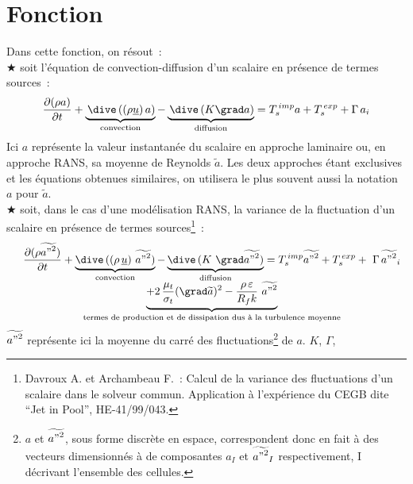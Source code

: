 \section*{Fonction}
Dans cette fonction, on résout~: \\
{\tiny$\bigstar$} soit l'équation de convection-diffusion d'un scalaire en
présence de termes sources~:
\begin{equation}
\frac {\partial  (\rho a)}{\partial t} +
\underbrace{\,\dive\,((\rho \underline{u})\,a)}_{\text{convection}}
- \underbrace{\,\dive\,(K \grad a)}_{\text{diffusion}} = T_s^{\,imp} a
+T_s^{\,exp} +\Gamma\,a_i
\end{equation}
Ici $a$ représente la valeur instantanée du scalaire en approche laminaire ou,
en approche RANS, sa moyenne de Reynolds $\widetilde{a}$. Les deux approches
étant exclusives et les équations obtenues similaires, on utilisera le plus
souvent aussi la notation $a$ pour $\widetilde{a}$.\\
{\tiny$\bigstar$} soit, dans le cas d'une modélisation RANS, la variance de la
fluctuation d'un scalaire en présence de termes sources\footnote{Davroux A. et
Archambeau F.~: Calcul de la variance des fluctuations
d'un scalaire dans le solveur commun. Application à l'expérience du CEGB dite
``Jet in Pool'', HE-41/99/043.}~:
\begin{equation}
\begin{array}{lcl}
&\displaystyle
 \frac {\partial  (\rho \widetilde{{a"}^2})}{\partial t} +
\underbrace{\dive\,((\rho\,\underline{u})\ \widetilde{{a"}^2})}_{\text{convection}}
- \underbrace{\dive\,(K\ \grad \widetilde{{a"}^2})}_{\text{diffusion}} = T_s^{\,imp} \widetilde{{a"}^2}
+T_s^{\,exp} +\ \Gamma\,\widetilde{{a"}^2}_i \\
&\displaystyle \underbrace {+ 2\,\frac{\mu_t}{\sigma_t}(\grad \widetilde{a})^2 -
\frac{\rho\,\varepsilon}{R_f k}\ \widetilde{{a"}^2}}_{\text{termes de production et
de dissipation dus à la turbulence moyenne}}
\end{array}
\end{equation}
$\widetilde{{a"}^2}$ représente ici la moyenne du carré des fluctuations\footnote{$a$ et
$\widetilde{{a"}^2}$, sous forme discrète en espace, correspondent donc en
fait à des vecteurs dimensionnés à  de composantes $a_I$ et $\widetilde{{a"}^2}_{I}$
respectivement, I décrivant l'ensemble des cellules.} de $a$. $K$, $\Gamma$,
